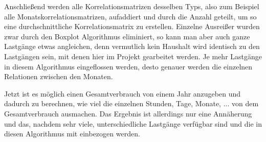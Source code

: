 Anschließend werden alle Korrelationsmatrizen desselben Typs, also zum Beispiel alle Monatskorrelationsmatrizen, aufaddiert und durch die Anzahl geteilt, um so eine durchschnittliche Korrelationsmatrix zu erstellen. Einzelne Ausreißer wurden zwar durch den Boxplot Algorithmus eliminiert, so kann man aber auch ganze Lastgänge etwas angleichen, denn vermutlich kein Haushalt wird identisch zu den Lastgängen sein, mit denen hier im Projekt gearbeitet werden. Je mehr Lastgänge in diesem Algorithmus eingeflossen werden, desto genauer werden die einzelnen Relationen zwischen den Monaten.

Jetzt ist es möglich einen Gesamtverbrauch von einem Jahr anzugeben und dadurch zu berechnen, wie viel die einzelnen Stunden, Tage, Monate, ... von dem Gesamtverbrauch ausmachen. Das Ergebnis ist allerdings nur eine Annäherung und das, nachdem sehr viele, unterschiedliche Lastgänge verfügbar sind und die in diesen Algorithmus mit einbezogen werden.